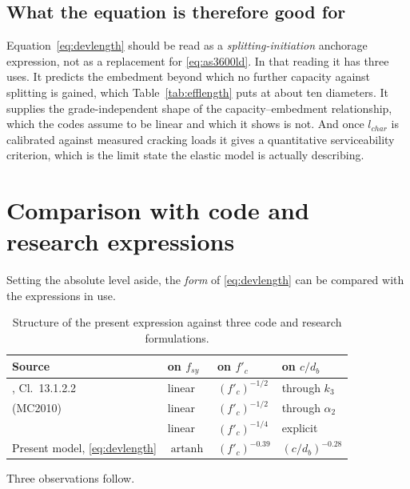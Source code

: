 \subsection{What the equation is therefore good for}

Equation~\eqref{eq:devlength} should be read as a \emph{splitting-initiation}
anchorage expression, not as a replacement for
\eqref{eq:as3600ld}. In that reading it has three uses. It predicts the
embedment beyond which no further capacity against splitting is gained,
which Table~\ref{tab:efflength} puts at about ten diameters. It supplies the
grade-independent shape of the capacity--embedment relationship, which the
codes assume to be linear and which it shows is not. And once $l_{char}$ is
calibrated against measured cracking loads it gives a quantitative
serviceability criterion, which is the limit state the elastic model is
actually describing.


\section{Comparison with code and research expressions}
\label{sec:codecompare}

Setting the absolute level aside, the \emph{form} of \eqref{eq:devlength}
can be compared with the expressions in use.

\begin{table}[H]
\centering
\caption{Structure of the present expression against three code and
         research formulations.}
\label{tab:codecompare}
\small
\begin{tabular*}{\linewidth}{@{\extracolsep{\fill}}llll@{}}
\hline
Source & on $f_{sy}$ & on $f'_c$ & on $c/d_b$ \\
\hline
\textcite{as3600ConcreteStructures2018}, Cl.~13.1.2.2
   & linear & $(f'_c)^{-1/2}$ & through $k_3$ \\
\textcite{cairnsBondAnchorageEmbedded2015} (MC2010)
   & linear & $(f'_c)^{-1/2}$ & through $\alpha_2$ \\
\textcite{408R03BondDevelopment}
   & linear & $(f'_c)^{-1/4}$ & explicit \\
Present model, \eqref{eq:devlength}
   & $\operatorname{artanh}$ & $(f'_c)^{-0.39}$ & $(c/d_b)^{-0.28}$ \\
\hline
\end{tabular*}
\end{table}

Three observations follow.

